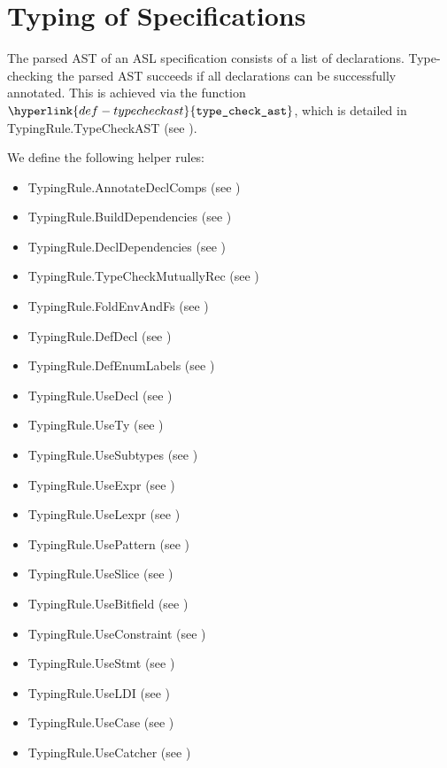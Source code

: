 \documentclass{book}
\newcommand\typecheckast[0]{\hyperlink{def-typecheckast}{\texttt{type\_check\_ast}}}
\begin{document}
\chapter{Typing of Specifications}

The parsed AST of an ASL specification consists of a list of declarations.
Type-checking the parsed AST succeeds if all declarations can be successfully annotated.
This is achieved via the function $\typecheckast$, which is detailed in
TypingRule.TypeCheckAST (see ).

We define the following helper rules:
\begin{itemize}
  \item TypingRule.AnnotateDeclComps (see )
  \item TypingRule.BuildDependencies (see )
  \item TypingRule.DeclDependencies (see )
  \item TypingRule.TypeCheckMutuallyRec (see )
  \item TypingRule.FoldEnvAndFs (see )
  \item TypingRule.DefDecl (see )
  \item TypingRule.DefEnumLabels (see )
  \item TypingRule.UseDecl (see )
  \item TypingRule.UseTy (see )
  \item TypingRule.UseSubtypes (see )
  \item TypingRule.UseExpr (see )
  \item TypingRule.UseLexpr (see )
  \item TypingRule.UsePattern (see )
  \item TypingRule.UseSlice (see )
  \item TypingRule.UseBitfield (see )
  \item TypingRule.UseConstraint (see )
  \item TypingRule.UseStmt (see )
  \item TypingRule.UseLDI (see )
  \item TypingRule.UseCase (see )
  \item TypingRule.UseCatcher (see )
\end{itemize}
\end{document}
